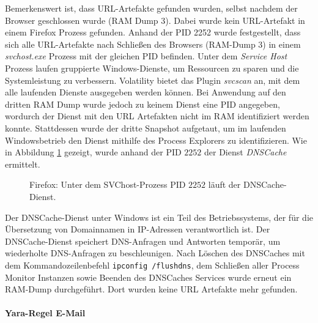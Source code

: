 Bemerkenswert ist, dass URL-Artefakte gefunden wurden, selbst nachdem der Browser geschlossen wurde (RAM Dump 3). Dabei wurde kein URL-Artefakt in einem Firefox Prozess gefunden.
Anhand der PID 2252 wurde festgestellt, dass sich alle URL-Artefakte nach Schließen des Browsers (RAM-Dump 3) in einem \textit{svchost.exe} Prozess mit der gleichen PID befinden. Unter dem \textit{Service Host} Prozess laufen gruppierte Windows-Dienste, um Ressourcen zu sparen und die Systemleistung zu verbessern.
Volatility bietet das Plugin \textit{svcscan} an, mit dem alle laufenden Dienste ausgegeben werden können.
Bei Anwendung auf den dritten RAM Dump wurde jedoch zu keinem Dienst eine PID angegeben, wordurch der Dienst mit den URL Artefakten nicht im RAM identifiziert werden konnte. \cite{Nicholasswhite.05.06.2023}
Stattdessen wurde der dritte Snapshot aufgetaut, um im laufenden Windowsbetrieb den Dienst mithilfe des Process Explorers zu identifizieren.
Wie in Abbildung \ref{chart:svchost-dnscache} gezeigt, wurde anhand der PID $2252$ der Dienst \textit{DNSCache} ermittelt.
\begin{figure}[h!]
	\centerline{}
	\caption{Firefox: Unter dem SVChost-Prozess PID $2252$ läuft der DNSCache-Dienst.}
	\label{chart:svchost-dnscache}  
\end{figure}
Der DNSCache-Dienst unter Windows ist ein Teil des Betriebssystems, der für die Übersetzung von Domainnamen in IP-Adressen verantwortlich ist. Der DNSCache-Dienst speichert DNS-Anfragen und Antworten temporär, um wiederholte DNS-Anfragen zu beschleunigen. \cite{MicrosoftLearn.05.06.2023}
Nach Löschen des DNSCaches mit dem Kommandozeilenbefehl \texttt{ipconfig /flushdns}, dem Schließen aller Process Monitor Instanzen sowie Beenden des DNSCaches Services wurde erneut ein RAM-Dump durchgeführt. Dort wurden keine URL Artefakte mehr gefunden.

\paragraph*{Yara-Regel \glqq{}E-Mail\grqq{}}

